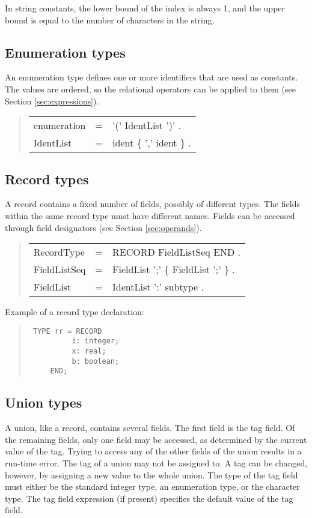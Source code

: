 \documentclass[10pt]{article}
\newenvironment{grammar}
{\begin{quote} \begin{tabular}{p{3.8cm} l l}}
{\end{tabular}\end{quote}}
\begin{document}
In string constants, the lower bound of the index is always 1, and the
upper bound is equal to the number of characters in the string.
\subsection{Enumeration types}\label{sec:enumeration_types}

An enumeration type defines one or more identifiers that are used
as constants.
The values are ordered, so the relational operators can be applied to
them (see Section \ref{sec:expressions}).
\begin{grammar}
enumeration & = & '(' IdentList ')' . \\
IdentList & = & ident \{ ',' ident \} .
\end{grammar}
\subsection{Record types}\label{sec:record_types}

A record contains a fixed number of fields, possibly of different types.
The fields within the same record type must have different names.
Fields can be accessed through field designators (see Section \ref{sec:operands}).
\begin{grammar}
RecordType & = & RECORD FieldListSeq END . \\
FieldListSeq & = & FieldList ';' \{ FieldList ';' \} . \\
FieldList & = & IdentList ':' subtype .
\end{grammar}
Example of a record type declaration:
\begin{quote}\tt
TYPE rr = RECORD \\
\mbox{~~~~~~~~~~}i:~integer;  \\
\mbox{~~~~~~~~~~}x:~real; \\
\mbox{~~~~~~~~~~}b:~boolean; \\
\mbox{~~~~~}END;
\end{quote}
\subsection{Union types}\label{sec:union_types}

A union, like a record, contains several fields.
The first field is the tag field.
Of the remaining fields, only one field may be accessed, as determined
by the current value of the tag. Trying to access any of the other fields
of the union results in a run-time error.
The tag of a union may not be assigned to.
A tag can be changed, however, by assigning a new value to the whole union.
The type of the tag field must either be the standard integer type,
an enumeration type, or the character type.
The tag field expression (if present)
specifies the default value of the tag field.
\end{document}

